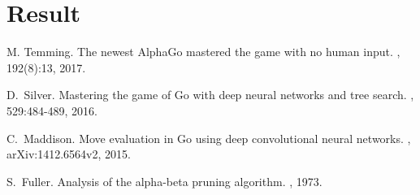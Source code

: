 \documentclass[11pt]{article}
\begin{document}
\section*{Result}

\newpage

\begin{thebibliography}{99}

\newblock M. Temming.
\newblock The newest AlphaGo mastered the game with no human input.
, 192(8):13, 2017.

\newblock D.~Silver.
\newblock Mastering the game of Go with deep neural networks and tree search.
, 529:484-489, 2016.

\newblock C.~Maddison.
\newblock Move evaluation in Go using deep convolutional neural networks.
, arXiv:1412.6564v2, 2015.

\newblock S.~Fuller.
\newblock Analysis of the alpha-beta pruning algorithm. 
, 1973.

\end{thebibliography}
\end{document}
